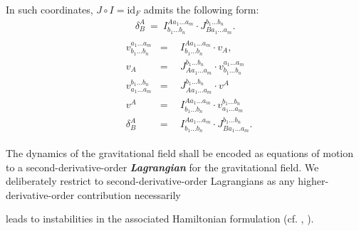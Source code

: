 \documentclass[%
preprint,
nofootinbib,
amsmath,amssymb,
aps,
prd,
floatfix,
]{revtex4-2}
\begin{document}
In such coordinates, $J\circ I = \mathrm{id}_F$ admits the following form:
\begin{align}
    \delta^A _ B \ = \ I^{A a_1 ... a_m}_{b_1 ... b_n} \cdot J^{b_1 ... b_n}_{B a_1 ... a_m}.  
\end{align}
\fi 
\begin{align} \label{interRel}
    \begin{aligned}
    & v^{a_1 ... a_m}_{b_1 ... b_n} & = & \ \ I^{A a_1 ... a_m}_{b_1 ... b_n} \cdot v_{A},\\  
    & v_A & = & \ \ J^{b_1 ... b_n}_{A a_1 ... a_m} \cdot v^{a_1 ... a_m}_{b_1 ... b_n}\\
    & v^{b_1 ... b_n}_{a_1 ... a_m} & = & \ \ J^{b_1 ... b_n}_{A a_1 ... a_m} \cdot v^{A}\\  
    & v^A & = & \ \  I^{A a_1 ... a_m}_{b_1 ... b_n} \cdot v^{b_1 ... b_n}_{a_1 ... a_m} \\
     &\delta^A _ B &  = & \ \ I^{A a_1 ... a_m}_{b_1 ... b_n} \cdot J^{b_1 ... b_n}_{B a_1 ... a_m}.  
    \end{aligned}
\end{align}

The dynamics of the gravitational field shall be encoded as equations of motion to a second-derivative-order \textit{\textbf{Lagrangian}} for the gravitational field. We deliberately restrict to second-derivative-order Lagrangians as any higher-derivative-order contribution necessarily
\iffalse
also contributes to the equations of motion in higher than second derivative order. These contributions would then, however, 
\fi
leads to instabilities in the associated Hamiltonian formulation (cf. \cite{Ostrogradsky:1850fid}, \cite{2015arXiv150602210W}). 
\end{document}
